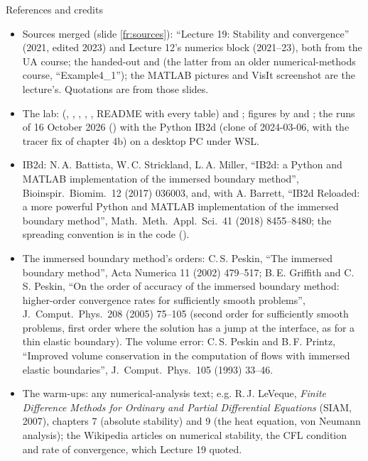 \documentclass[aspectratio=169,11pt]{beamer}
\begin{document}
\begin{frame}{References and credits}
\label{fr:refs}
\scriptsize
\begin{itemize}
  \item Sources merged (slide \ref{fr:sources}): ``Lecture 19: Stability and convergence'' (2021, edited 2023) and Lecture 12's numerics block (2021--23), both from the UA course; the handed-out  and  (the latter from an older numerical-methods course, ``Example4\_1''); the MATLAB pictures and VisIt screenshot are the lecture's. Quotations are from those slides.
  \item The lab:  (, , , , , README with every table) and ; figures by  and ; the runs of 16 October 2026 () with the Python IB2d (clone of 2024-03-06, with the tracer fix of chapter 4b) on a desktop PC under WSL.
  \item IB2d: N.\,A. Battista, W.\,C. Strickland, L.\,A. Miller, ``IB2d: a Python and MATLAB implementation of the immersed boundary method'', Bioinspir.\ Biomim.\ 12 (2017) 036003, and, with A. Barrett, ``IB2d Reloaded: a more powerful Python and MATLAB implementation of the immersed boundary method'', Math.\ Meth.\ Appl.\ Sci.\ 41 (2018) 8455--8480; the spreading convention is in the code ().
  \item The immersed boundary method's orders: C.\,S. Peskin, ``The immersed boundary method'', Acta Numerica 11 (2002) 479--517; B.\,E. Griffith and C.\,S. Peskin, ``On the order of accuracy of the immersed boundary method: higher-order convergence rates for sufficiently smooth problems'', J.\ Comput.\ Phys.\ 208 (2005) 75--105 (second order for sufficiently smooth problems, first order where the solution has a jump at the interface, as for a thin elastic boundary). The volume error: C.\,S. Peskin and B.\,F. Printz, ``Improved volume conservation in the computation of flows with immersed elastic boundaries'', J.\ Comput.\ Phys.\ 105 (1993) 33--46.
  \item The warm-ups: any numerical-analysis text; e.g. R.\,J. LeVeque, \emph{Finite Difference Methods for Ordinary and Partial Differential Equations} (SIAM, 2007), chapters 7 (absolute stability) and 9 (the heat equation, von Neumann analysis); the Wikipedia articles on numerical stability, the CFL condition and rate of convergence, which Lecture 19 quoted.
\end{itemize}
\end{frame}
\end{document}
